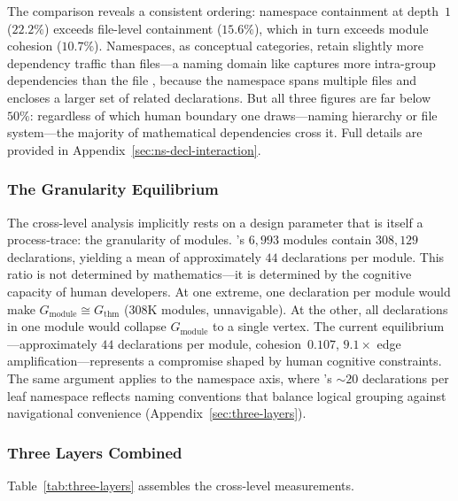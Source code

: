 The comparison reveals a consistent ordering: namespace containment at depth~$1$ ($22.2\%$) exceeds file-level containment ($15.6\%$), which in turn exceeds module cohesion ($10.7\%$). Namespaces, as conceptual categories, retain slightly more dependency traffic than files---a naming domain like  captures more intra-group dependencies than the file , because the namespace spans multiple files and encloses a larger set of related declarations. But all three figures are far below~$50\%$: regardless of which human boundary one draws---naming hierarchy or file system---the majority of mathematical dependencies cross it. Full details are provided in Appendix~\ref{sec:ns-decl-interaction}.

\subsubsection{The Granularity Equilibrium}
\label{sec:granularity-main}

The cross-level analysis implicitly rests on a design parameter that is itself a process-trace: the granularity of modules. 's $6{,}993$ modules contain $308{,}129$ declarations, yielding a mean of approximately $44$ declarations per module. This ratio is not determined by mathematics---it is determined by the cognitive capacity of human developers. At one extreme, one declaration per module would make $G_{\mathrm{module}} \cong G_{\mathrm{thm}}$ ($308$K modules, unnavigable). At the other, all declarations in one module would collapse $G_{\mathrm{module}}$ to a single vertex. The current equilibrium---approximately $44$ declarations per module, cohesion~$0.107$, $9.1\times$ edge amplification---represents a compromise shaped by human cognitive constraints. The same argument applies to the namespace axis, where 's ${\sim}20$ declarations per leaf namespace reflects naming conventions that balance logical grouping against navigational convenience (Appendix~\ref{sec:three-layers}).

\subsubsection{Three Layers Combined}
\label{sec:three-layers-main}

Table~\ref{tab:three-layers} assembles the cross-level measurements.

